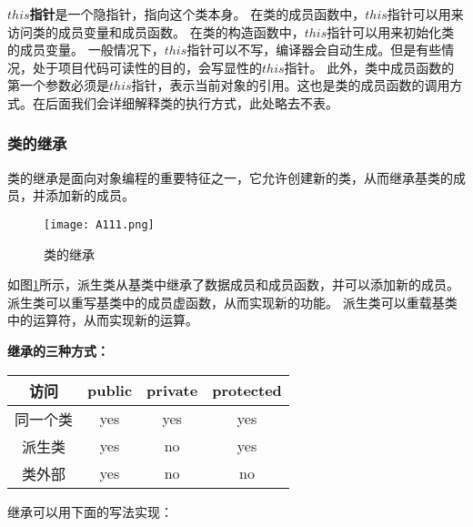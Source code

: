 \textbf{$this$指针}是一个隐指针，指向这个类本身。
在类的成员函数中，$this$指针可以用来访问类的成员变量和成员函数。
在类的构造函数中，$this$指针可以用来初始化类的成员变量。
一般情况下，$this$指针可以不写，编译器会自动生成。但是有些情况，处于项目代码可读性的目的，会写显性的$this$指针。
此外，类中成员函数的第一个参数必须是$this$指针，表示当前对象的引用。这也是类的成员函数的调用方式。在后面我们会详细解释类的执行方式，此处略去不表。

\subsubsection{类的继承}
类的继承是面向对象编程的重要特征之一，它允许创建新的类，从而继承基类的成员，并添加新的成员。

\begin{figure}[H]
    \centering
    \texttt{[image: A111.png]}
    \caption{类的继承} %
    \label{fig:A111} %
\end{figure}

如图\ref{fig:A111}所示，派生类从基类中继承了数据成员和成员函数，并可以添加新的成员。
派生类可以重写基类中的成员虚函数，从而实现新的功能。
派生类可以重载基类中的运算符，从而实现新的运算。

\begin{center}
\textbf{继承的三种方式：}

    \begin{tabular}{cccc}
        \hline
        访问 & public & private & protected \\
        \hline
        同一个类 & yes & yes & yes \\
        派生类 & yes & no & yes \\
        类外部 & yes & no & no \\ 
        \hline
        
    \end{tabular}
\end{center}

继承可以用下面的写法实现：


